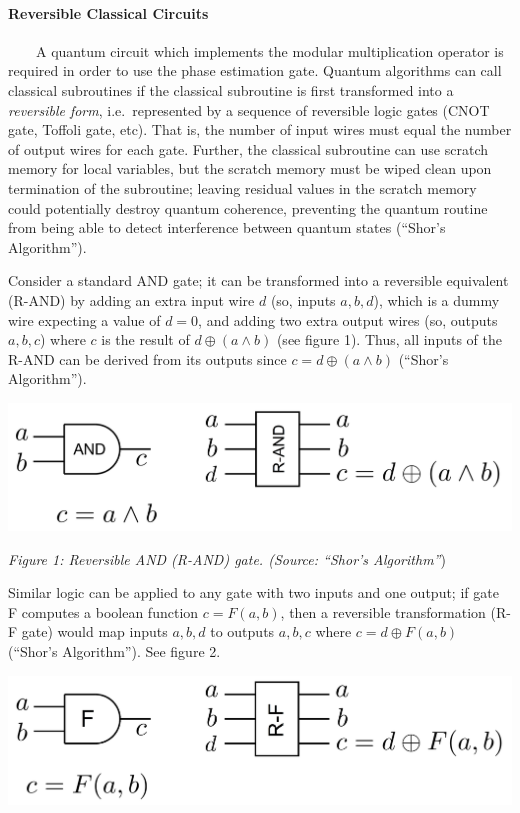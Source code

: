 \documentclass[11pt]{article}
\makeatletter
\def\maxwidth{\ifdim\Gin@nat@width>\linewidth\linewidth
    \else\Gin@nat@width\fi}
\let\Oldincludegraphics\includegraphics
\renewcommand{\includegraphics}[1]{\Oldincludegraphics[width=.8\maxwidth]{#1}}
\makeatother
\begin{document}
    \hypertarget{reversible-classical-circuits}{%
\paragraph{Reversible Classical
Circuits}\label{reversible-classical-circuits}}

~~~~A quantum circuit which implements the modular multiplication
operator is required in order to use the phase estimation gate. Quantum
algorithms can call classical subroutines if the classical subroutine is
first transformed into a \emph{reversible form}, i.e.~represented by a
sequence of reversible logic gates (CNOT gate, Toffoli gate, etc). That
is, the number of input wires must equal the number of output wires for
each gate. Further, the classical subroutine can use scratch memory for
local variables, but the scratch memory must be wiped clean upon
termination of the subroutine; leaving residual values in the scratch
memory could potentially destroy quantum coherence, preventing the
quantum routine from being able to detect interference between quantum
states (``Shor's Algorithm'').

Consider a standard AND gate; it can be transformed into a reversible
equivalent (R-AND) by adding an extra input wire \(d\) (so, inputs
\(a, b, d\)), which is a dummy wire expecting a value of \(d=0\), and
adding two extra output wires (so, outputs \(a, b, c\)) where \(c\) is
the result of \(d\oplus (a\wedge b)\) (see figure 1). Thus, all inputs
of the R-AND can be derived from its outputs since
\(c=d\oplus (a\wedge b)\) (``Shor's Algorithm'').

\includegraphics{r-and-gate.png}

\emph{Figure 1: Reversible AND (R-AND) gate. (Source: ``Shor's
Algorithm''})

 Similar logic can be applied to any gate with two inputs and one
output; if gate F computes a boolean function \(c=F(a,b)\), then a
reversible transformation (R-F gate) would map inputs \(a, b, d\) to
outputs \(a, b, c\) where \(c=d\oplus F(a, b)\) (``Shor's Algorithm'').
See figure 2.

\includegraphics{r-f-gate.png}
\end{document}
